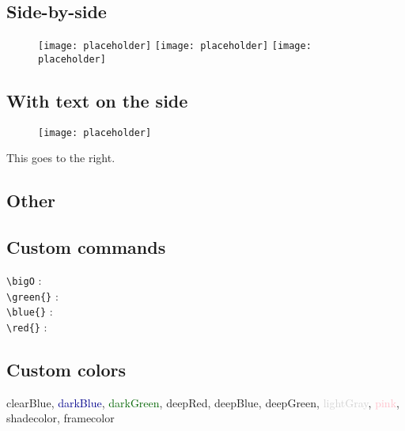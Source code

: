 \documentclass{customSynthesis}
\begin{document}
\subsection*{Side-by-side}

\begin{figure}[H]
    \centering
    \texttt{[image: placeholder]}\hfill
	\texttt{[image: placeholder]}\hfill
	\texttt{[image: placeholder]}
\end{figure}

\subsection*{With text on the side}

\begin{minipage}{0.48\textwidth}
	\begin{figure}[H]
		\centering
		\texttt{[image: placeholder]}
	\end{figure}
\end{minipage}
\begin{minipage}{0.5\textwidth}
	This goes to the right.
\end{minipage}

\subsection*{Other}

\subsection*{Custom commands}

\verb|\bigO| : \bigO\\
\verb|\green{}| : \\
\verb|\blue{}| : \\
\verb|\red{}| : 

\subsection*{Custom colors}

\textcolor{clearBlue}{clearBlue}, \textcolor{darkBlue}{darkBlue}, \textcolor{darkGreen}{darkGreen}, \textcolor{deepRed}{deepRed}, \textcolor{deepBlue}{deepBlue}, \textcolor{deepGreen}{deepGreen}, \textcolor{lightGray}{lightGray}, \textcolor{pink}{pink}, \textcolor{shadecolor}{shadecolor}, \textcolor{framecolor}{framecolor}
\end{document}
